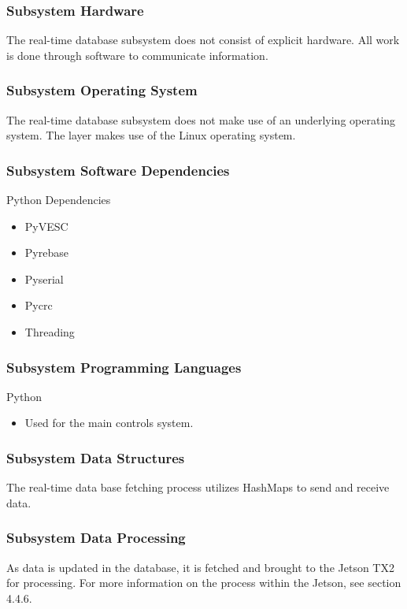 \subsubsection{Subsystem Hardware}
The real-time database subsystem does not consist of explicit hardware. All work is done through software to communicate information.

\subsubsection{Subsystem Operating System}
The real-time database subsystem does not make use of an underlying operating system. The layer makes use of the Linux operating system.

\subsubsection{Subsystem Software Dependencies}
Python Dependencies
\begin{itemize}
    \item PyVESC
    \item Pyrebase
    \item Pyserial
    \item Pycrc
    \item Threading
\end{itemize}

\subsubsection{Subsystem Programming Languages}
Python
\begin{itemize}
    \item Used for the main controls system.
\end{itemize}

\subsubsection{Subsystem Data Structures}
The real-time data base fetching process utilizes HashMaps to send and receive data. 

\subsubsection{Subsystem Data Processing}
As data is updated in the database, it is fetched and brought to the Jetson TX2 for processing. For more information on the process within the Jetson, see section 4.4.6.
